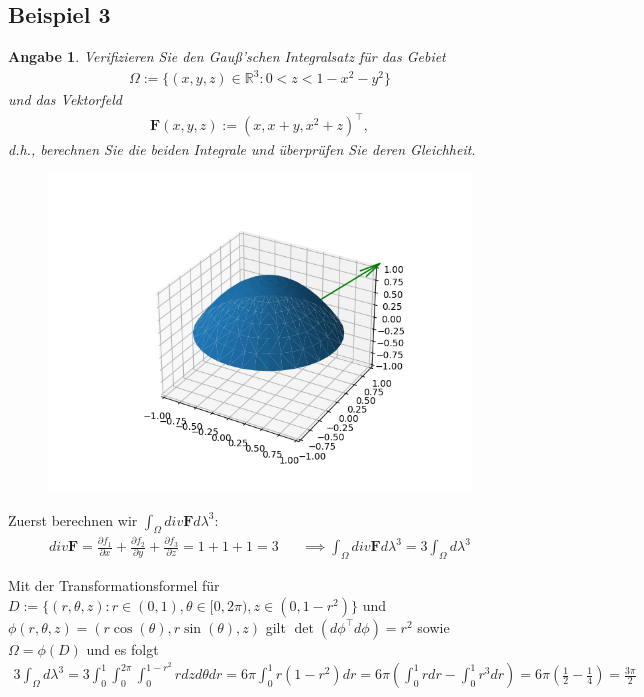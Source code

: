 \documentclass[]{article}
\newtheorem*{angabe*}{Angabe}
\begin{document}
\subsection*{Beispiel 3}
\begin{angabe*}
	Verifizieren Sie den Gauß'schen Integralsatz für das Gebiet
	\begin{align*}
		\Omega := \{(x,y,z) \in \mathbb{R}^3: 0<z<1-x^2-y^2\}
	\end{align*}
	und das Vektorfeld
	\begin{align*}
		\bm{F}(x,y,z) := (x, x+y, x^2+z)^\top,
	\end{align*}
	d.h., berechnen Sie die beiden Integrale und überprüfen Sie deren Gleichheit.
\end{angabe*}

\begin{figure}[h!]
	\center
	\includegraphics[width=0.5\columnwidth]{bsp_3.png}
\end{figure}

Zuerst berechnen wir $\int_\Omega div\bm{F} d\lambda^3$:
\begin{align*}
	div\bm{F} = \frac{\partial f_1}{\partial x} + \frac{\partial f_2}{\partial y} + \frac{\partial f_3}{\partial z} = 1 + 1 + 1 = 3 && \implies	\int_\Omega div\bm{F} d\lambda^3 = 3 \int_\Omega d\lambda^3
\end{align*}

Mit der Transformationsformel für $D:=\{(r,\theta, z): r \in (0,1), \theta \in [0,2\pi), z \in (0,1-r^2)\}$ und $\phi(r,\theta, z) = (r\cos(\theta), r\sin(\theta), z)$ gilt $\det(d\phi^\top d\phi) = r^2$ sowie $\Omega=\phi(D)$ und es folgt
\begin{align*}
	3 \int_\Omega d\lambda^3 = 3 \int_{0}^{1} \int_{0}^{2\pi} \int_{0}^{1-r^2} r dz d\theta dr = 6\pi \int_{0}^{1} r(1-r^2) dr = 6\pi \left(\int_{0}^{1} r dr - \int_{0}^{1} r^3 dr\right) = 6\pi (\frac{1}{2}-\frac{1}{4}) = \frac{3\pi}{2}
\end{align*}
\end{document}
